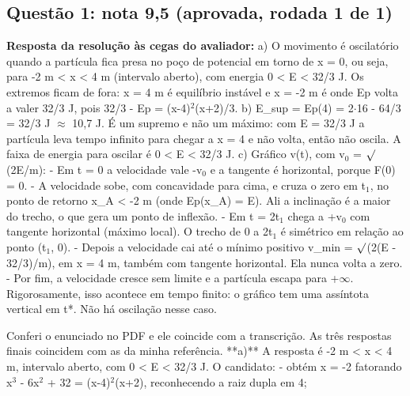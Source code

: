\documentclass{article}%
\begin{document}
\subsection*{Questão 1: nota 9,5 (aprovada, rodada 1 de 1)}%
\textbf{Resposta da resolução às cegas do avaliador:} a) O movimento é oscilatório quando a partícula fica presa no poço de potencial em torno de x = 0, ou seja, para -2 m < x < 4 m (intervalo aberto), com energia 0 < E < 32/3 J. Os extremos ficam de fora: x = 4 m é equilíbrio instável e x = -2 m é onde Ep volta a valer 32/3 J, pois 32/3 - Ep = (x-4)$^2$(x+2)/3.\newline%
\newline%
b) E\_sup = Ep(4) = 2$\cdot$16 - 64/3 = 32/3 J $\approx$ 10,7 J. É um supremo e não um máximo: com E = 32/3 J a partícula leva tempo infinito para chegar a x = 4 e não volta, então não oscila. A faixa de energia para oscilar é 0 < E < 32/3 J.\newline%
\newline%
c) Gráfico v(t), com v$_{0}$ = $\surd$(2E/m):\newline%
{-} Em t = 0 a velocidade vale -v$_{0}$ e a tangente é horizontal, porque F(0) = 0.\newline%
{-} A velocidade sobe, com concavidade para cima, e cruza o zero em t$_{1}$, no ponto de retorno x\_A < -2 m (onde Ep(x\_A) = E). Ali a inclinação é a maior do trecho, o que gera um ponto de inflexão.\newline%
{-} Em t = 2t$_{1}$ chega a +v$_{0}$ com tangente horizontal (máximo local). O trecho de 0 a 2t$_{1}$ é simétrico em relação ao ponto (t$_{1}$, 0).\newline%
{-} Depois a velocidade cai até o mínimo positivo v\_min = $\surd$(2(E - 32/3)/m), em x = 4 m, também com tangente horizontal. Ela nunca volta a zero.\newline%
{-} Por fim, a velocidade cresce sem limite e a partícula escapa para +$\infty$. Rigorosamente, isso acontece em tempo finito: o gráfico tem uma assíntota vertical em t*.\newline%
Não há oscilação nesse caso.\par %
Conferi o enunciado no PDF e ele coincide com a transcrição. As três respostas finais coincidem com as da minha referência.\newline%
\newline%
**a)** A resposta é -2 m < x < 4 m, intervalo aberto, com 0 < E < 32/3 J. O candidato:\newline%
{-} obtém x = -2 fatorando x$^3$ - 6x$^2$ + 32 = (x-4)$^2$(x+2), reconhecendo a raiz dupla em 4;\newline%
\end{document}

